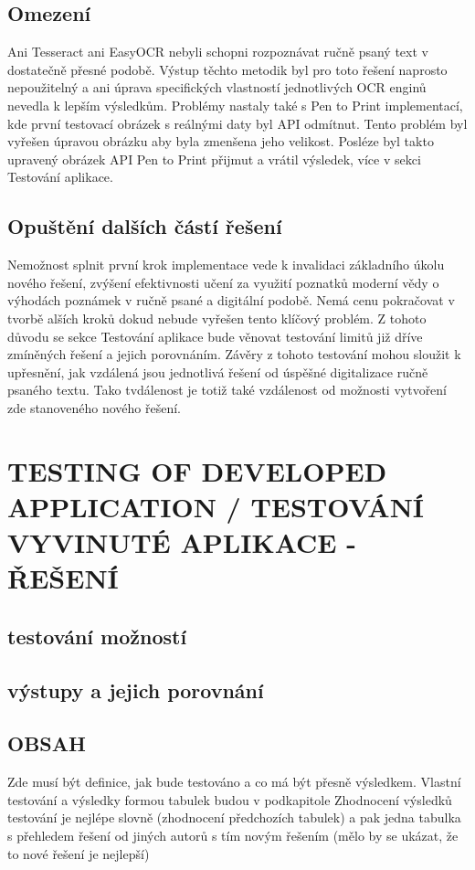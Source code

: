 \documentclass[journal]{IEEEtran}
\begin{document}
\subsection{Omezení}
Ani Tesseract ani EasyOCR nebyli schopni rozpoznávat ručně psaný text v dostatečně přesné podobě.
Výstup těchto metodik byl pro toto řešení naprosto nepoužitelný a ani úprava specifických vlastností jednotlivých \ac{OCR} enginů nevedla k lepším výsledkům.
Problémy nastaly také s Pen to Print implementací, kde první testovací obrázek s reálnými daty byl  \ac{API} odmítnut.
Tento problém byl vyřešen úpravou obrázku aby byla zmenšena jeho velikost.
Posléze byl takto upravený obrázek \ac{API} Pen to Print přijmut a vrátil výsledek, více v sekci Testování aplikace.

\subsection{Opuštění dalších částí řešení}
Nemožnost splnit první krok implementace vede k invalidaci základního úkolu nového řešení, zvýšení efektivnosti učení za využití poznatků moderní vědy o výhodách poznámek v ručně psané a digitální podobě.
Nemá cenu pokračovat v tvorbě alších kroků dokud nebude vyřešen tento klíčový problém.
Z tohoto důvodu se  sekce Testování aplikace bude věnovat testování limitů již dříve zmíněných řešení a jejich porovnáním.
Závěry z tohoto testování mohou sloužit k upřesnění, jak vzdálená jsou jednotlivá řešení od úspěšné digitalizace ručně psaného textu.
Tako tvdálenost je totiž také vzdálenost od možnosti vytvoření zde stanoveného nového řešení.


\section{TESTING OF DEVELOPED APPLICATION / TESTOVÁNÍ VYVINUTÉ APLIKACE - ŘEŠENÍ}

\subsection{testování možností}

\subsection{výstupy a jejich porovnání}

\subsection{OBSAH}
Zde musí být definice, jak bude testováno a co má být přesně výsledkem.
Vlastní testování a výsledky formou tabulek budou v podkapitole
Zhodnocení výsledků testování je nejlépe slovně (zhodnocení předchozích tabulek) a pak jedna tabulka s přehledem řešení od jiných autorů s tím novým řešením (mělo by se ukázat, že to nové řešení je nejlepší)
\end{document}
